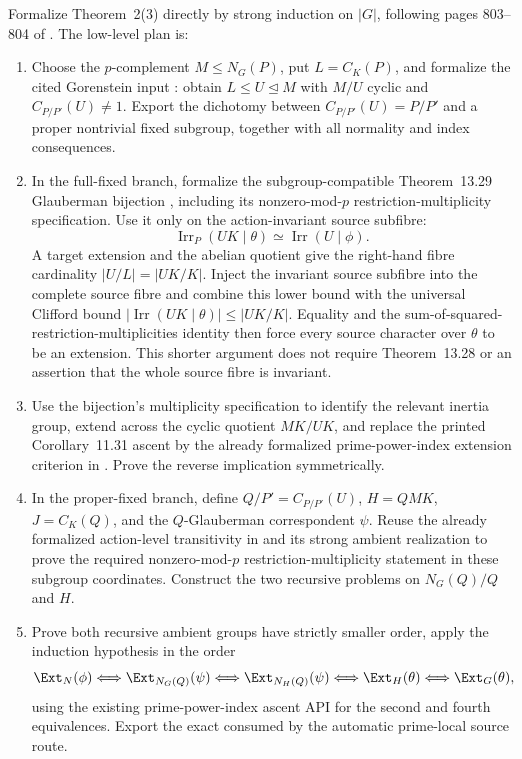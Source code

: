 \documentclass[11pt]{article}
\newcommand{\Irr}{\operatorname{Irr}}
\begin{document}
Formalize Theorem~2(3) directly by strong induction on \(|G|\), following
pages 803--804 of \cite{OkuyamaWajima1980}.  The low-level plan is:
\begin{enumerate}[label=\textbf{P1.C.OW\arabic*.},leftmargin=*]
  \item Choose the \(p\)-complement \(M\leq N_G(P)\), put
  \(L=C_K(P)\), and formalize the cited Gorenstein input
  \cite[Chapter~3, Theorem~2.2]{Gorenstein1968}: obtain
  \(L\leq U\trianglelefteq M\) with \(M/U\)
  cyclic and \(C_{P/P'}(U)\neq1\).  Export the dichotomy between
  \(C_{P/P'}(U)=P/P'\) and a proper nontrivial fixed subgroup, together
  with all normality and index consequences.
  \item In the full-fixed branch, formalize the subgroup-compatible
  Theorem~13.29 Glauberman bijection
  \cite[Theorem~13.29]{Isaacs1976}, including its nonzero-mod-\(p\)
  restriction-multiplicity specification.  Use it only on the
  action-invariant source subfibre:
  \[
    \Irr_P(UK\mid\theta)\simeq\Irr(U\mid\phi).
  \]
  A target extension and the abelian quotient give the right-hand fibre
  cardinality \(|U/L|=|UK/K|\).  Inject the invariant source subfibre into
  the complete source fibre and combine this lower bound with the
  universal Clifford bound
  \(|\Irr(UK\mid\theta)|\leq |UK/K|\).  Equality and the
  sum-of-squared-restriction-multiplicities identity then force every
  source character over \(\theta\) to be an extension.  This shorter
  argument does not require Theorem~13.28 or an assertion that the whole
  source fibre is invariant.
  \item Use the bijection's multiplicity specification to identify the
  relevant inertia group, extend across the cyclic quotient \(MK/UK\),
  and replace the printed Corollary~11.31 ascent by the already formalized
  prime-power-index extension criterion in
  .  Prove the
  reverse implication symmetrically.
  \item In the proper-fixed branch, define
  \(Q/P'=C_{P/P'}(U)\), \(H=QMK\), \(J=C_K(Q)\), and the
  \(Q\)-Glauberman correspondent \(\psi\).  Reuse the already formalized
  action-level transitivity in
   and its
  strong ambient realization to prove the required nonzero-mod-\(p\)
  restriction-multiplicity statement in these subgroup coordinates.
  Construct the two recursive problems on \(N_G(Q)/Q\) and \(H\).
  \item Prove both recursive ambient groups have strictly smaller order,
  apply the induction hypothesis in the order
  \[
    \Ext_N(\phi)\Longleftrightarrow
    \Ext_{N_G(Q)}(\psi)\Longleftrightarrow
    \Ext_{N_H(Q)}(\psi)\Longleftrightarrow
    \Ext_H(\theta)\Longleftrightarrow
    \Ext_G(\theta),
  \]
  using the existing prime-power-index ascent API for the second and
  fourth equivalences.  Export the exact
   consumed by
  the automatic prime-local source route.
\end{enumerate}
\end{document}

